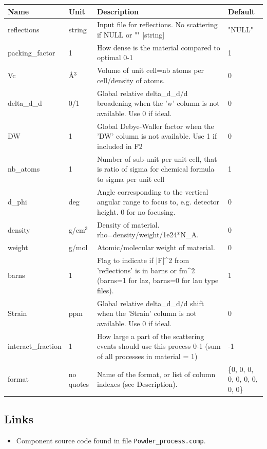 \begin{longtable}{p{}p{}p{}p{}}
\toprule
\textbf{Name} & \textbf{Unit} & \textbf{Description} & \textbf{Default} \\
\midrule
\endhead
reflections & string & Input file for reflections. No scattering if NULL or "" [string] & "NULL" \\
packing\_factor & 1 & How dense is the material compared to optimal 0-1 & 1 \\
Vc & \AA{}$^{3}$ & Volume of unit cell=nb atoms per cell/density of atoms. & 0 \\
delta\_d\_d & 0/1 & Global relative delta\_d\_d/d broadening when the 'w' column is not available. Use 0 if ideal. & 0 \\
DW & 1 & Global Debye-Waller factor when the 'DW' column is not available. Use 1 if included in F2 & 0 \\
nb\_atoms & 1 & Number of sub-unit per unit cell, that is ratio of sigma for chemical formula to sigma per unit cell & 1 \\
d\_phi & deg & Angle corresponding to the vertical angular range to focus to, e.g. detector height. 0 for no focusing. & 0 \\
density & g/cm$^{3}$ & Density of material. rho=density/weight/1e24*N\_A. & 0 \\
weight & g/mol & Atomic/molecular weight of material. & 0 \\
barns & 1 & Flag to indicate if |F|\textasciicircum{}2 from 'reflections' is in barns or fm\textasciicircum{}2 (barns=1 for laz, barns=0 for lau type files). & 1 \\
Strain & ppm & Global relative delta\_d\_d/d shift when the 'Strain' column is not available. Use 0 if ideal. & 0 \\
interact\_fraction & 1 & How large a part of the scattering events should use this process 0-1 (sum of all processes in material = 1) & -1 \\
format & no quotes & Name of the format, or list of column indexes (see Description). & \{0, 0, 0, 0, 0, 0, 0, 0, 0\} \\
\bottomrule
\end{longtable}

\subsection*{Links}
\begin{itemize}
  \item Component source code found in file \texttt{Powder\_process.comp}.
\end{itemize}
